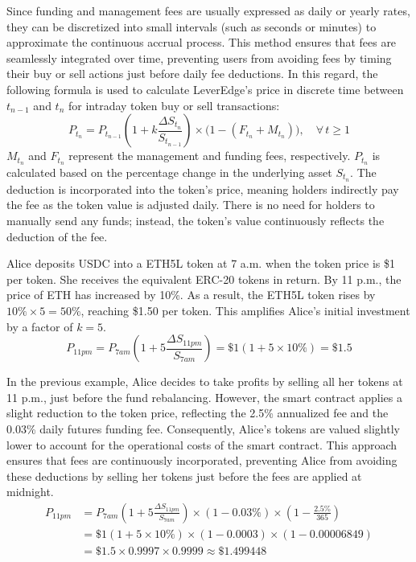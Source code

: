 Since funding and management fees are usually expressed as daily or yearly rates, they can be discretized into small intervals (such as seconds or minutes) to approximate the continuous accrual process. This method ensures that fees are seamlessly integrated over time, preventing users from avoiding fees by timing their buy or sell actions just before daily fee deductions. In this regard, the following formula is used to calculate LeverEdge's price in discrete time between \( t_{n-1} \) and \( t_n \) for intraday token buy or sell transactions:
\begin{equation}\label{eq:lvt2}
	P_{t_n} = P_{t_{n-1}}\left(1+k\frac{\Delta S_{t_{n}}}{S_{t_{n-1}}}\right) \times \big(1 - (F_{t_n} + M_{t_n}) \big), \quad \forall \, t \ge 1
\end{equation}
\(M_{t_n}\) and \(F_{t_n}\) represent the management and funding fees, respectively. \(P_{t_n}\) is calculated based on the percentage change in the underlying asset \(S_{t_{n}}\). The deduction is incorporated into the token's price, meaning holders indirectly pay the fee as the token value is adjusted daily. There is no need for holders to manually send any funds; instead, the token’s value continuously reflects the deduction of the fee.

\begin{example}
	Alice deposits USDC into a ETH5L token at 7 a.m. when the token price is \$1 per token. She receives the equivalent ERC-20 tokens in return. By 11 p.m., the price of ETH has increased by 10\%. As a result, the ETH5L token rises by \(10\% \times 5 = 50\%\), reaching \$1.50 per token. This amplifies Alice's initial investment by a factor of \(k=5\).
	\begin{equation*}
		P_{11pm} = P_{7am}\left(1+5\frac{\Delta S_{11pm}}{S_{7am}}\right) = \$1 (1+5 \times 10\%) = \$1.5
	\end{equation*}
\end{example}

\begin{example}
	In the previous example, Alice decides to take profits by selling all her tokens at 11 p.m., just before the fund rebalancing. However, the smart contract applies a slight reduction to the token price, reflecting the 2.5\% annualized fee and the 0.03\% daily futures funding fee. Consequently, Alice's tokens are valued slightly lower to account for the operational costs of the smart contract. This approach ensures that fees are continuously incorporated, preventing Alice from avoiding these deductions by selling her tokens just before the fees are applied at midnight.
	\begin{equation*}
		\begin{aligned}
			P_{11pm} &= P_{7am}\left(1+5\frac{\Delta S_{11pm}}{S_{7am}}\right) \times (1-0.03\%) \times \left(1-\frac{2.5\%}{365}\right)\\
			&= \$1 (1+5 \times 10\%) \times (1-0.0003) \times (1-0.00006849)\\
			&= \$1.5 \times 0.9997 \times 0.9999 \approx \$1.499448
		\end{aligned}
	\end{equation*}
\end{example}

